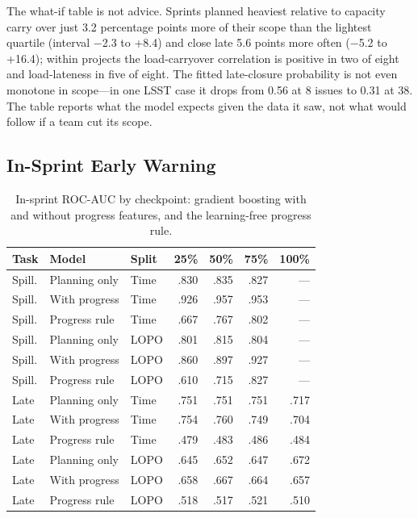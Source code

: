 \documentclass[conference]{IEEEtran}
\begin{document}
The what-if table is not advice. Sprints planned heaviest relative to capacity carry over just 3.2 percentage points more of their scope than the lightest quartile (interval $-$2.3 to +8.4) and close late 5.6 points more often ($-$5.2 to +16.4); within projects the load-carryover correlation is positive in two of eight and load-lateness in five of eight. The fitted late-closure probability is not even monotone in scope---in one LSST case it drops from 0.56 at 8 issues to 0.31 at 38. The table reports what the model expects given the data it saw, not what would follow if a team cut its scope.

\subsection{In-Sprint Early Warning}

\begin{table}[!t]
\centering\footnotesize
\caption{In-sprint ROC-AUC by checkpoint: gradient boosting with and without progress features, and the learning-free progress rule.}
\label{tab:insprint}
\setlength{\tabcolsep}{6pt}
\begin{tabular}{lllrrrr}
\hline
Task & Model & Split & 25\% & 50\% & 75\% & 100\%\\
\hline
Spill. & Planning only & Time & .830 & .835 & .827 & ---\\
Spill. & With progress & Time & .926 & .957 & .953 & ---\\
Spill. & Progress rule & Time & .667 & .767 & .802 & ---\\
Spill. & Planning only & LOPO & .801 & .815 & .804 & ---\\
Spill. & With progress & LOPO & .860 & .897 & .927 & ---\\
Spill. & Progress rule & LOPO & .610 & .715 & .827 & ---\\
Late & Planning only & Time & .751 & .751 & .751 & .717\\
Late & With progress & Time & .754 & .760 & .749 & .704\\
Late & Progress rule & Time & .479 & .483 & .486 & .484\\
Late & Planning only & LOPO & .645 & .652 & .647 & .672\\
Late & With progress & LOPO & .658 & .667 & .664 & .657\\
Late & Progress rule & LOPO & .518 & .517 & .521 & .510\\
\hline
\end{tabular}
\end{table}
\end{document}
